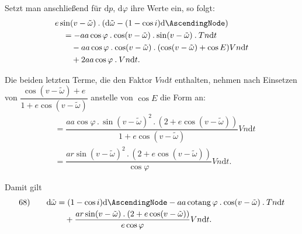 Setzt man anschließend für \(\mathrm{d}p\), \(\mathrm{d}\varphi\) ihre Werte ein, so folgt:
\[
\begin{aligned}
&e\sin(v-\tilde\omega)\mathbin{.}(\mathrm{d}\tilde\omega-(1-\cos i)\mathrm{d}\AscendingNode)\\
&\quad=-aa\cos\varphi\mathbin{.}\cos(v-\tilde\omega)\mathbin{.}\sin(v-\tilde\omega)\mathbin{.}Tn\mathrm{d}t\\
&\qquad-aa\cos\varphi\mathbin{.}\cos(v-\tilde\omega)\mathbin{.}(\cos(v-\tilde\omega)+\cos E)Vn\mathrm{d}t\\
&\qquad+2aa\cos\varphi\mathbin{.}Vn\mathrm{d}t.
\end{aligned}
\]
\par Die beiden letzten Terme, die den Faktor \(Vn\mathrm{d}t\) enthalten, nehmen nach Einsetzen von \(\dfrac{\cos(v-\tilde\omega)+e}{1+e\cos(v-\tilde\omega)}\) anstelle von \(\cos E\) die Form an:
\[
\begin{aligned}
&=\dfrac{aa\cos\varphi\mathbin{.}\sin(v-\tilde\omega)^2\mathbin{.}(2+e\cos(v-\tilde\omega))}{1+e\cos(v-\tilde\omega)}Vn\mathrm{d}t\\[4pt]
&=\dfrac{ar\sin(v-\tilde\omega)^2\mathbin{.}(2+e\cos(v-\tilde\omega))}{\cos\varphi}Vn\mathrm{d}t.
\end{aligned}
\]
\par Damit gilt
\[
\begin{array}{rl}
68)\quad&\begin{aligned}[t]\mathrm{d}\tilde\omega&=(1-\cos i)\mathrm{d}\AscendingNode-aa\operatorname{cotang}\varphi\mathbin{.}\cos(v-\tilde\omega)\mathbin{.}Tn\mathrm{d}t\\
&\quad+\dfrac{ar\sin(v-\tilde\omega)\mathbin{.}(2+e\cos(v-\tilde\omega))}{e\cos\varphi}Vn\mathrm{d}t.\end{aligned}
\end{array}
\]
